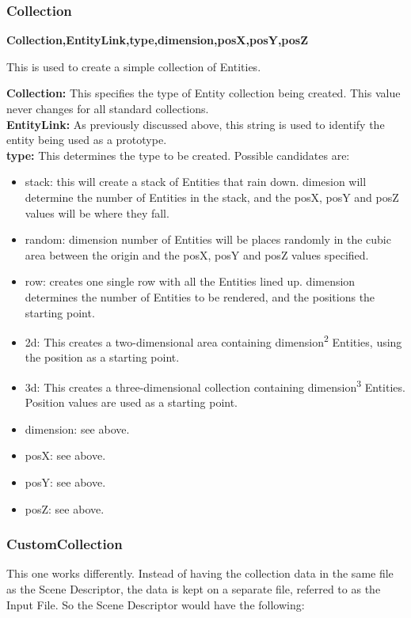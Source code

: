 \documentclass[a4paper,12pt]{article}
\begin{document}
\subsubsection{Collection}

\textbf{Collection,EntityLink,type,dimension,posX,posY,posZ}

This is used to create a simple collection of Entities.

\textbf{Collection:} This specifies the type of Entity collection being created. This value never changes for all standard collections.\\
\textbf{EntityLink:} As previously discussed above, this string is used to identify the entity being used as a prototype.\\
\textbf{type:} This determines the type to be created. Possible candidates are:
\begin{itemize}
\item stack: this will create a stack of Entities that rain down. dimesion will determine the number of Entities in the stack, and the posX, posY and posZ values will be where they fall.
\item random: dimension number of Entities will be places randomly in the cubic area between the origin and the posX, posY and posZ values specified.
\item row: creates one single row with all the Entities lined up. dimension determines the number of Entities to be rendered, and the positions the starting point.
\item 2d: This creates a two-dimensional area containing dimension\textsuperscript{2} Entities, using the position as a starting point.
\item 3d: This creates a three-dimensional collection containing dimension\textsuperscript{3} Entities. Position values are used as a starting point.
\item dimension: see above.
\item posX: see above.
\item posY: see above.
\item posZ: see above.
\end{itemize}

\subsubsection{CustomCollection}

This one works differently. Instead of having the collection data in the same file as the Scene Descriptor, the data is kept on a separate file, referred to as the Input File. So the Scene Descriptor would have the following:
\end{document}
